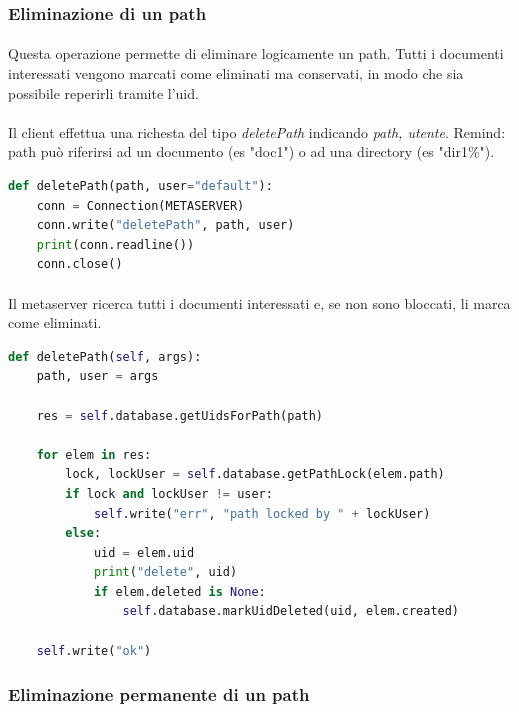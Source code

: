 \documentclass{article}
\begin{document}
\subsubsection{Eliminazione di un path}

\paragraph{} Questa operazione permette di eliminare logicamente un path. Tutti i documenti interessati vengono marcati come eliminati ma conservati, in modo che sia possibile reperirli tramite l'uid.

\paragraph{} Il client effettua una richesta del tipo \emph{deletePath} indicando \emph{path, utente}. Remind: path può riferirsi ad un documento (es "doc1") o ad una directory (es "dir1\%"). 

\begin{lstlisting}[language=Python, title=Client]
def deletePath(path, user="default"):
    conn = Connection(METASERVER)
    conn.write("deletePath", path, user)
    print(conn.readline())
    conn.close()
\end{lstlisting}

\paragraph{} Il metaserver ricerca tutti i documenti interessati e, se non sono bloccati, li marca come eliminati. 

\begin{lstlisting}[language=Python, title=Metaserver]
def deletePath(self, args):
    path, user = args

    res = self.database.getUidsForPath(path)

    for elem in res:
        lock, lockUser = self.database.getPathLock(elem.path)
        if lock and lockUser != user:
            self.write("err", "path locked by " + lockUser)
        else:
            uid = elem.uid
            print("delete", uid)
            if elem.deleted is None:
                self.database.markUidDeleted(uid, elem.created)

    self.write("ok")
\end{lstlisting}

\subsubsection{Eliminazione permanente di un path}
\end{document}
